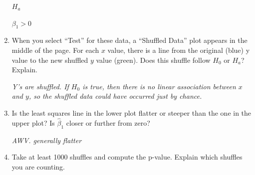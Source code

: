 \begin{enumerate}
  $H_a$
\begin{students}
 \vspace{1cm}      
\end{students}
\begin{key}
  {\it  $\beta_1 > 0$   }
\end{key}

\item When you select ``Test'' for these data, a ``Shuffled Data''
  plot appears in the middle of the page. For each $x$ value, there is
  a line from the original (blue) y value to the new shuffled $y$
  value (green).   Does this shuffle follow $H_0$ or $H_a$?  Explain.
\begin{students}
 \vspace{1cm}      
\end{students}

\begin{key}
  {\it  Y's are shuffled. If $H_0$
  is true, then there is no linear association between $x$ and $y$, so
the shuffled data could have occurred just by chance.}
\end{key}


\item %
Is the least squares line in the lower plot  flatter or steeper than
the one  in the upper plot?  Is $\hat{\beta}_1$ closer or further
from zero? 
\begin{students}
 \vspace{1cm}      
\end{students}

\begin{key}
  {\it AWV.  generally flatter}
\end{key}

\item  Take at least 1000 shuffles and compute the p-value.  Explain
  which shuffles you are counting. 
\begin{students}
 \vspace{2cm}      
\end{students}


\end{enumerate}
